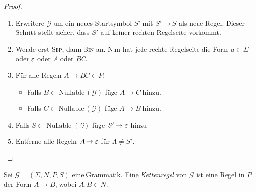 \begin{proof}
  \hfill
  \begin{enumerate}
  \item Erweitere $\mathcal{G}$ um ein neues Startsymbol $S'$ mit $S' \to S$ als neue Regel.
    Dieser Schritt stellt sicher, dass $S'$ auf keiner rechten Regelseite vorkommt.
  \item Wende erst \textsc{Sep}, dann \textsc{Bin} an.
    Nun hat jede rechte Regelseite die Form $a \in \Sigma$ oder $\varepsilon$ oder $A$ oder $BC$.
  \item Für alle Regeln $A \to BC \in P$:
    \begin{itemize}
    \item Falls $B \in \operatorname{Nullable}(\mathcal{G})$ füge $A \to C$ hinzu.
    \item Falls $C \in \operatorname{Nullable}(\mathcal{G})$ füge $A \to B$ hinzu.
    \end{itemize}
  \item Falls $S \in \operatorname{Nullable}(\mathcal{G})$ füge $S' \to \varepsilon$ hinzu
  \item Entferne alle Regeln $A \to \varepsilon$ für $A \neq S'$.
  \end{enumerate}
\end{proof}

\begin{Def}
  Sei $\mathcal{G} = (\Sigma, N, P, S)$ eine Grammatik.
  Eine \emph{Kettenregel} von $\mathcal{G}$ ist eine Regel in $P$ der Form $A \to B$, wobei $A,B \in N$.
\end{Def}

